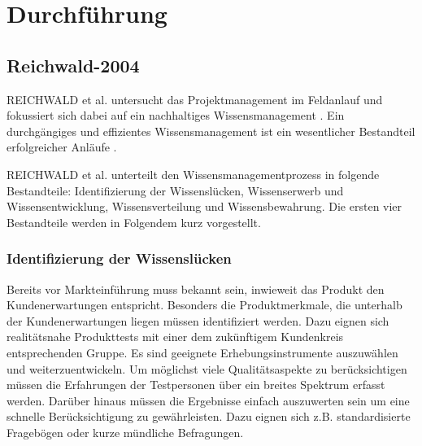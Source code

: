 \chapter{Durchführung}

\section{Reichwald-2004}
REICHWALD et al. untersucht das Projektmanagement im Feldanlauf und fokussiert sich dabei auf ein nachhaltiges Wissensmanagement \cite{Reichwald2004}. Ein durchgängiges und effizientes Wissensmanagement ist ein wesentlicher Bestandteil erfolgreicher Anläufe \cite{Kuhn2002}. %

REICHWALD et al. unterteilt den Wissensmanagementprozess in folgende Bestandteile: Identifizierung der Wissenslücken, Wissenserwerb und Wissensentwicklung, Wissensverteilung und Wissensbewahrung. Die ersten vier Bestandteile werden in Folgendem kurz vorgestellt. 

\subsection{Identifizierung der Wissenslücken}
Bereits vor Markteinführung muss bekannt sein, inwieweit das Produkt den Kundenerwartungen entspricht. Besonders die Produktmerkmale, die unterhalb der Kundenerwartungen liegen müssen identifiziert werden. Dazu eignen sich realitätsnahe Produkttests mit einer dem zukünftigem Kundenkreis entsprechenden Gruppe. Es sind geeignete Erhebungsinstrumente auszuwählen und weiterzuentwickeln. Um möglichst viele Qualitätsaspekte zu berücksichtigen müssen die Erfahrungen der Testpersonen über ein breites Spektrum erfasst werden. Darüber hinaus müssen die Ergebnisse einfach auszuwerten sein um eine schnelle Berücksichtigung zu gewährleisten. Dazu eignen sich z.B. standardisierte Fragebögen oder kurze mündliche Befragungen. 

